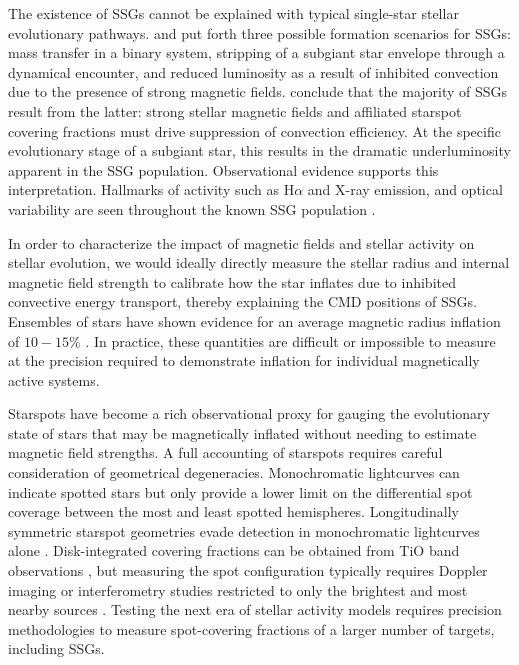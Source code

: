 \documentclass[trackchanges]{aastex631}
\begin{document}
The existence of SSGs cannot be explained with typical single-star stellar evolutionary pathways. \citet{geller17} and \citet{leiner17} put forth three possible formation scenarios for SSGs: mass transfer in a binary system, stripping of a subgiant star envelope through a dynamical encounter, and reduced luminosity as a result of inhibited convection due to the presence of strong magnetic fields. \citet{leiner17} conclude that the majority of SSGs result from the latter: strong stellar magnetic fields and affiliated starspot covering fractions must drive suppression of convection efficiency. At the specific evolutionary stage of a subgiant star, this results in the dramatic underluminosity apparent in the SSG population. Observational evidence supports this interpretation.  Hallmarks of activity such as  H$\alpha$ and X-ray emission, and optical variability are seen throughout the known SSG population \citep{geller17}.

In order to characterize the impact of magnetic fields and stellar activity on stellar evolution, we would ideally directly measure the stellar radius and internal magnetic field strength to calibrate how the star inflates due to inhibited convective energy transport, thereby explaining the CMD positions of SSGs.  Ensembles of stars have shown evidence for an average magnetic radius inflation of $10-15\%$ \citep{2018AJ....155..225K,2018MNRAS.476.3245J}. In practice, these quantities are difficult or impossible to measure at the precision required to demonstrate inflation for individual magnetically active systems.



Starspots have become a rich observational proxy for gauging the evolutionary state of stars that may be magnetically inflated without needing to estimate magnetic field strengths.  A full accounting of starspots requires careful consideration of geometrical degeneracies.  Monochromatic lightcurves can indicate spotted stars \citep{2014ApJS..211...24M} but only provide a lower limit on the differential spot coverage between the most and least spotted hemispheres. Longitudinally symmetric starspot geometries evade detection in monochromatic lightcurves alone \citep{2019AJ....157...64L}. Disk-integrated covering fractions can be obtained from TiO band observations \citep{oneal96,fang2016,2019AJ....158..101M}, but measuring the spot configuration typically requires Doppler imaging or interferometry studies restricted to only the brightest and most nearby sources \citep{roettenbacher16}.  Testing the next era of stellar activity models requires precision methodologies to measure spot-covering fractions of a larger number of targets, including SSGs.
\end{document}
